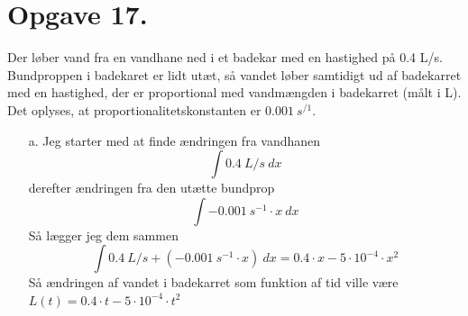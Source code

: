 \documentclass[12pt]{article}
\begin{document}
\section*{Opgave 17.}
Der løber vand fra en vandhane ned i et badekar med en hastighed på 0.4 L/s.
Bundproppen i badekaret er lidt utæt, så vandet løber samtidigt ud af badekarret med en
hastighed, der er proportional med vandmængden i badekarret (målt i L). Det oplyses, at
proportionalitetskonstanten er $0.001 \ s^{/1}$.
\begin{enumerate}
  \item[a.] Jeg starter med at finde ændringen fra vandhanen
  $$\int 0.4 \ L/s \ dx$$
  derefter ændringen fra den utætte bundprop
  $$\int -0.001 \ s^{-1} \cdot x \ dx$$
  Så lægger jeg dem sammen
  $$\int 0.4 \ L/s+(-0.001 \ s^{-1} \cdot x)\ dx = 0.4 \cdot x-5 \cdot 10^{-4} \cdot x^{2}$$
  Så ændringen af vandet i badekarret som funktion af tid ville være\\ $L(t)=0.4 \cdot t-5 \cdot 10^{-4}\cdot t^{2}$
\end{enumerate}
\end{document}
